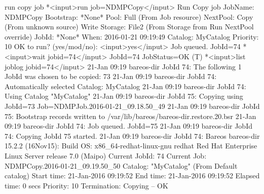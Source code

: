 \begin{bconsole}{run copy job}
*<input>run job=NDMPCopy</input>
Run Copy job
JobName:       NDMPCopy
Bootstrap:     *None*
Pool:          Full (From Job resource)
NextPool:      Copy (From unknown source)
Write Storage: File2 (From Storage from Run NextPool override)
JobId:         *None*
When:          2016-01-21 09:19:49
Catalog:       MyCatalog
Priority:      10
OK to run? (yes/mod/no): <input>yes</input>
Job queued. JobId=74
*<input>wait jobid=74</input>
JobId=74
JobStatus=OK (T)
*<input>list joblog jobid=74</input>
21-Jan 09:19 bareos-dir JobId 74: The following 1 JobId was chosen to be copied: 73
21-Jan 09:19 bareos-dir JobId 74: Automatically selected Catalog: MyCatalog
21-Jan 09:19 bareos-dir JobId 74: Using Catalog "MyCatalog"
21-Jan 09:19 bareos-dir JobId 75: Copying using JobId=73 Job=NDMPJob.2016-01-21_09.18.50_49
21-Jan 09:19 bareos-dir JobId 75: Bootstrap records written to /var/lib/bareos/bareos-dir.restore.20.bsr
21-Jan 09:19 bareos-dir JobId 74: Job queued. JobId=75
21-Jan 09:19 bareos-dir JobId 74: Copying JobId 75 started.
21-Jan 09:19 bareos-dir JobId 74: Bareos bareos-dir 15.2.2 (16Nov15):
  Build OS:               x86_64-redhat-linux-gnu redhat Red Hat Enterprise Linux Server release 7.0 (Maipo)
  Current JobId:          74
  Current Job:            NDMPCopy.2016-01-21_09.19.50_50
  Catalog:                "MyCatalog" (From Default catalog)
  Start time:             21-Jan-2016 09:19:52
  End time:               21-Jan-2016 09:19:52
  Elapsed time:           0 secs
  Priority:               10
  Termination:            Copying -- OK


\end{bconsole}
